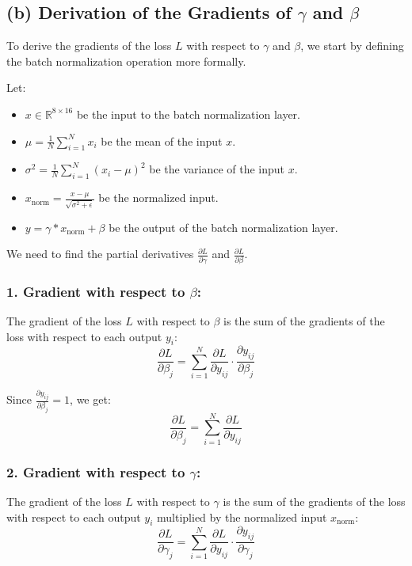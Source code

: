 \documentclass{article}
\begin{document}
\subsection*{(b) Derivation of the Gradients of $\gamma$ and $\beta$}

To derive the gradients of the loss $L$ with respect to $\gamma$ and $\beta$, we start by defining the batch normalization operation more formally.

Let:
\begin{itemize}
    \item $x \in \mathbb{R}^{8 \times 16}$ be the input to the batch normalization layer.
    \item $\mu = \frac{1}{N} \sum_{i=1}^{N} x_i$ be the mean of the input $x$.
    \item $\sigma^2 = \frac{1}{N} \sum_{i=1}^{N} (x_i - \mu)^2$ be the variance of the input $x$.
    \item $x_{\text{norm}} = \frac{x - \mu}{\sqrt{\sigma^2 + \epsilon}}$ be the normalized input.
    \item $y = \gamma \ast x_{\text{norm}} + \beta$ be the output of the batch normalization layer.
\end{itemize}

We need to find the partial derivatives $\frac{\partial L}{\partial \gamma}$ and $\frac{\partial L}{\partial \beta}$.

\subsubsection*{1. Gradient with respect to $\beta$:}

The gradient of the loss $L$ with respect to $\beta$ is the sum of the gradients of the loss with respect to each output $y_i$:
\[
\frac{\partial L}{\partial \beta_j} = \sum_{i=1}^{N} \frac{\partial L}{\partial y_{ij}} \cdot \frac{\partial y_{ij}}{\partial \beta_j}
\]

Since $\frac{\partial y_{ij}}{\partial \beta_j} = 1$, we get:
\[
\frac{\partial L}{\partial \beta_j} = \sum_{i=1}^{N} \frac{\partial L}{\partial y_{ij}}
\]

\subsubsection*{2. Gradient with respect to $\gamma$:}

The gradient of the loss $L$ with respect to $\gamma$ is the sum of the gradients of the loss with respect to each output $y_i$ multiplied by the normalized input $x_{\text{norm}}$:
\[
\frac{\partial L}{\partial \gamma_j} = \sum_{i=1}^{N} \frac{\partial L}{\partial y_{ij}} \cdot \frac{\partial y_{ij}}{\partial \gamma_j}
\]
\end{document}
